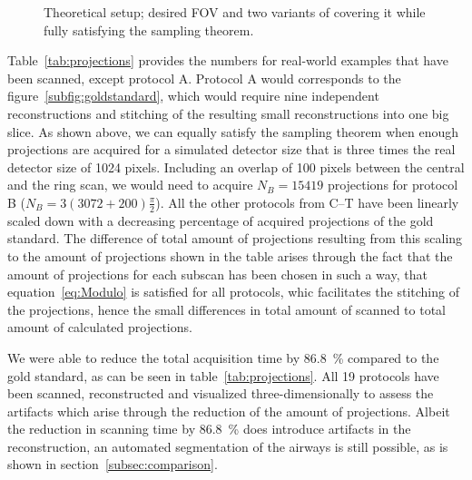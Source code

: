 \cbstart
\begin{figure*}
	\centering
	
	\caption{Theoretical setup; desired FOV and two variants of covering it while fully satisfying the sampling theorem.}
	\label{fig:goldstandard}
\end{figure*}
\cbend

\cbstart
Table~\ref{tab:projections} provides the numbers for real-world examples that have been scanned, except protocol A. Protocol A would corresponds to the figure~\ref{subfig:goldstandard}, which would require nine independent reconstructions and stitching of the resulting small reconstructions into one big slice. As shown above, we can equally satisfy the sampling theorem when enough projections are acquired for a simulated detector size that is three times the real detector size of 1024 pixels. Including an overlap of 100 pixels between the central and the ring scan, we would need to acquire $N_{B}=15419$ projections for protocol B ($N_{B}=3(3072+200)\frac{\pi}{2}$). All the other protocols from C--T have been linearly scaled down with a decreasing percentage of acquired projections of the gold standard. The difference of total amount of projections resulting from this scaling to the amount of projections shown in the table arises through the fact that the amount of projections for each subscan has been chosen in such a way, that equation~\ref{eq:Modulo} is satisfied for all protocols, whic facilitates the stitching of the projections, hence the small differences in total amount of scanned to total amount of calculated projections.

We were able to reduce the total acquisition time by \SI{86.8}{\percent} compared to the gold standard, as can be seen in table~\ref{tab:projections}. All 19 protocols have been scanned, reconstructed and visualized three-dimensionally to assess the artifacts which arise through the reduction of the amount of projections. Albeit the reduction in scanning time by \SI{86.8}{\percent} does introduce artifacts in the reconstruction, an automated segmentation of the airways is still possible, as is shown in section~\ref{subsec:comparison}.
\cbend


